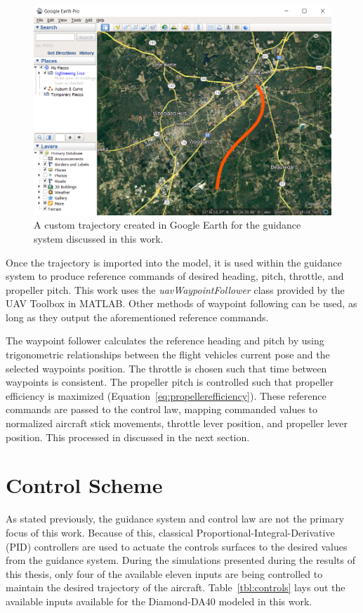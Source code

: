 \begin{figure}[!ht]
    \centering
    \includegraphics[width=0.75\linewidth]{Figures/auburnScurve.png}
    \caption{A custom trajectory created in Google Earth for the guidance system discussed in this work.}\label{fig:googleEarth}
\end{figure}

Once the trajectory is imported into the model, it is used within the guidance system to produce reference commands of desired heading, pitch, throttle, and propeller pitch. This work uses the \textit{uavWaypointFollower} class provided by the UAV Toolbox in MATLAB\@. Other methods of waypoint following can be used, as long as they output the aforementioned reference commands.

The waypoint follower calculates the reference heading and pitch by using trigonometric relationships between the flight vehicles current pose and the selected waypoints position. The throttle is chosen such that time between waypoints is consistent. The propeller pitch is controlled such that propeller efficiency is maximized (Equation~\ref{eq:propellerefficiency}). These reference commands are passed to the control law, mapping commanded values to normalized aircraft stick movements, throttle lever position, and propeller lever position. This processed in discussed in the next section.

\section{\textbf{Control Scheme}}

As stated previously, the guidance system and control law are not the primary focus of this work. Because of this, classical Proportional-Integral-Derivative (PID) controllers are used to actuate the controls surfaces to the desired values from the guidance system. During the simulations presented during the results of this thesis, only four of the available eleven inputs are being controlled to maintain the desired trajectory of the aircraft. Table~\ref{tbl:controls} lays out the available inputs available for the Diamond-DA40 modeled in this work.


